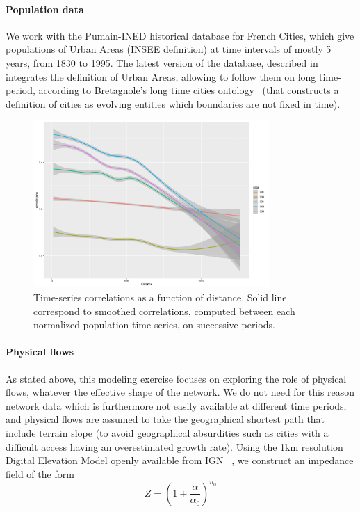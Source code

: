 \documentclass[Royal,sageh,times]{sagej}
\begin{document}
\paragraph{Population data}

We work with the Pumain-INED historical database for French Cities, which give populations of Urban Areas (INSEE definition)%
at time intervals of mostly 5 years, from 1830 to 1995. %
The latest version of the database, described in~\cite{}%
integrates the definition of Urban Areas, allowing to follow them on long time-period, according to Bretagnole's long time cities ontology~\cite{bretagnolle:tel-00459720} (that constructs a definition of cities as evolving entities which boundaries are not fixed in time).







\begin{figure}
\centering
\includegraphics[width=0.8\textwidth]{figures/empirical_tsCorrelations}
\caption{Time-series correlations as a function of distance. Solid line correspond to smoothed correlations, computed between each normalized population time-series, on successive periods.}
\end{figure}


\paragraph{Physical flows}

As stated above, this modeling exercise focuses on exploring the role of physical flows, whatever the effective shape of the network. We do not need for this reason network data which is furthermore not easily available at different time periods, and physical flows are assumed to take the geographical shortest path that include terrain slope (to avoid geographical absurdities such as cities with a difficult access having an overestimated growth rate). Using the 1km resolution Digital Elevation Model openly available from IGN~\cite{}%
, we construct an impedance field of the form
\[
Z = \left(1 + \frac{\alpha}{\alpha_0}\right)^{n_0}
\]
\end{document}
